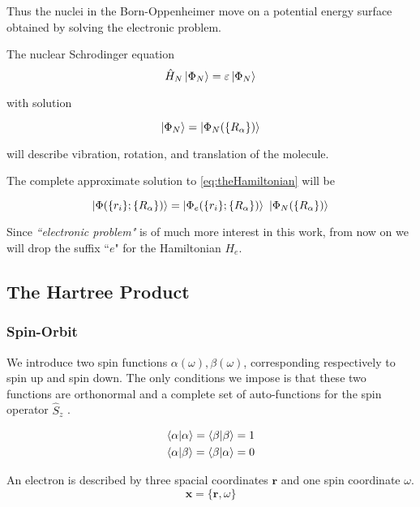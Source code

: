\documentclass[a4paper,12pt]{article}
\begin{document}
Thus the nuclei in the Born-Oppenheimer move on a potential energy surface obtained by solving the electronic problem.

The nuclear Schrodinger equation  
\begin{equation}
	\hat{H}_{N} \ket{\Phi_{N}} = \varepsilon \ket{\Phi_{N} }
\end{equation}

with solution 

\begin{equation}
	\ket{\Phi_{N}}=\ket{\Phi_{N}(\{R_{\alpha}\})}
\end{equation}

will describe vibration, rotation, and translation of the molecule.

The complete approximate solution to \eqref{eq:theHamiltonian} will be  \cite[p.43-45]{Attila}

\begin{equation}
	\ket{ \Phi(\{r_i\};\{R_{\alpha}\}) } 	= \ket{ \Phi_{e}(\{r_i\};\{R_{\alpha}\})} 
											~ \ket{ \Phi_{N}(\{R_{\alpha}\})}
\end{equation}

Since \textit{``electronic problem"} is of much more interest in this work, from now on we will drop the suffix ``$e$" for the Hamiltonian $H_{e}$.

\subsection{The Hartree Product}
\subsubsection{Spin-Orbit}
We introduce two spin functions  $\alpha(\omega), \beta(\omega)$, corresponding respectively to spin up and spin down.
The only conditions we impose is that these two functions are orthonormal and a complete set of auto-functions for the spin operator $\hat{S}_z$ .

\begin{align*}
	\bra{\alpha}\ket{\alpha} = \bra{\beta}\ket{\beta} = 1 \\
	\bra{\alpha}\ket{\beta} = \bra{\beta}\ket{\alpha} = 0
\end{align*}

An electron is described by three spacial coordinates $\mathbf{r}$ and one spin coordinate $\omega$.
\begin{equation}
	\mathbf{x} = \{\mathbf{r},\omega\}
\end{equation}
\end{document}

